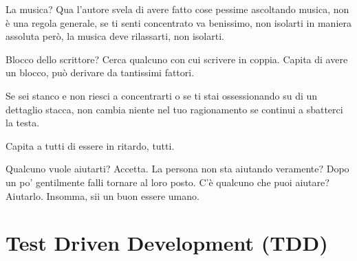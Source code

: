 \documentclass[11pt,a4paper]{book}
\begin{document}
La musica? Qua l'autore svela di avere fatto cose pessime ascoltando musica, non è una regola generale, se ti senti concentrato va benissimo, non isolarti in maniera assoluta però, la musica deve rilassarti, non isolarti.

Blocco dello scrittore? Cerca qualcuno con cui scrivere in coppia. Capita di avere un blocco, può derivare da tantissimi fattori.

Se sei stanco e non riesci a concentrarti o se ti stai ossessionando su di un dettaglio stacca, non cambia niente nel tuo ragionamento se continui a sbatterci la testa.

Capita a tutti di essere in ritardo, tutti.

Qualcuno vuole aiutarti? Accetta. La persona non sta aiutando veramente? Dopo un po' gentilmente falli tornare al loro posto. C'è qualcuno che puoi aiutare? Aiutarlo. Insomma, sii un buon essere umano.

\chapter{Test Driven Development (TDD)}
\end{document}
